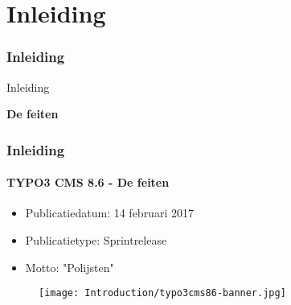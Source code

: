 %

\section{Inleiding}
\begin{frame}[fragile]
	\frametitle{Inleiding}

	\begin{center}\huge{Inleiding}\end{center}
	\begin{center}\huge{\color{typo3darkgrey}\textbf{De feiten}}\end{center}

\end{frame}

\begin{frame}[fragile]
	\frametitle{Inleiding}
	\framesubtitle{TYPO3 CMS 8.6 - De feiten}

	\begin{itemize}
		\item Publicatiedatum: 14 februari 2017
		\item Publicatietype: Sprintrelease
		\item Motto: "Polijsten"
	\end{itemize}

	\begin{figure}
		\texttt{[image: Introduction/typo3cms86-banner.jpg]}
	\end{figure}

\end{frame}

